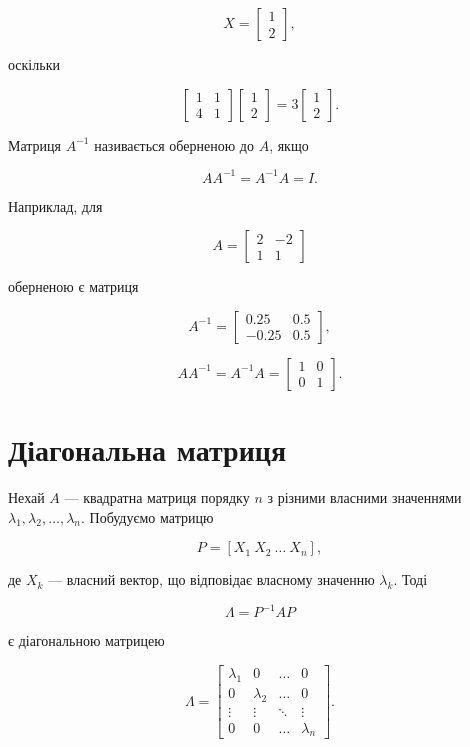 \documentclass[
  ukrainian,
]{article}
\begin{document}
\[
X=\begin{bmatrix} 1 \\ 2 \end{bmatrix},
\]

оскільки

\[
\begin{bmatrix} 1 & 1 \\ 4 & 1 \end{bmatrix}
\begin{bmatrix} 1 \\ 2 \end{bmatrix}
=
3\begin{bmatrix} 1 \\ 2 \end{bmatrix}.
\]

Матриця \(A^{-1}\) називається оберненою до \(A\), якщо

\[
AA^{-1}=A^{-1}A=I.
\]

Наприклад, для

\[
A=\begin{bmatrix} 2 & -2 \\ 1 & 1 \end{bmatrix}
\]

оберненою є матриця

\[
A^{-1}=
\begin{bmatrix}
0.25 & 0.5\\
-0.25 & 0.5
\end{bmatrix},
\]

\[AA^{-1}=A^{-1}A=\begin{bmatrix}1 & 0\\0 & 1\end{bmatrix}.\]

\section{Діагональна
матриця}\label{ux434ux456ux430ux433ux43eux43dux430ux43bux44cux43dux430-ux43cux430ux442ux440ux438ux446ux44f}

Нехай \(A\) --- квадратна матриця порядку \(n\) з різними власними
значеннями \(\lambda_1,\lambda_2,\dots,\lambda_n\). Побудуємо матрицю

\[P=[X_1\ X_2\ \dots\ X_n],\]

де \(X_k\) --- власний вектор, що відповідає власному значенню
\(\lambda_k\). Тоді

\[\Lambda = P^{-1}AP\]

є діагональною матрицею

\[\Lambda =\begin{bmatrix}\lambda_1 & 0 & \dots & 0\\0 & \lambda_2 & \dots & 0\\\vdots & \vdots & \ddots & \vdots\\0 & 0 & \dots & \lambda_n\end{bmatrix}.\]
\end{document}
